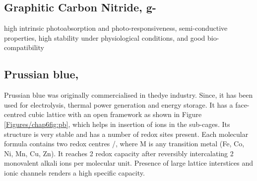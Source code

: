 \subsection*{Graphitic Carbon Nitride, g-}
high intrinsic photoabsorption and photo-responsiveness, semi-conductive properties, high stability under physiological conditions, and good bio-compatibility
\subsection*{Prussian blue, }
Prussian blue was originally commercialised in thedye industry. Since, it has been used for electrolysis, thermal power generation and energy storage. It has a face-centred cubic lattice with an open framework as shown in Figure \ref{Figures/chap6fig:pb}, which helps in insertion of ions in the sub-cages. Its structure is very stable and has a number of redox sites present. Each molecular formula contains two redox centres /, where M is any transition metal (Fe, Co, Ni, Mn, Cu, Zn). It reaches 2 redox capacity after reversibly intercalating 2 monovalent alkali ions per molecular unit. Presence of large lattice interstices and ionic channels renders a high specific capacity. 

